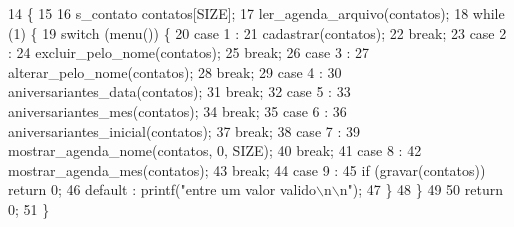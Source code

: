 \begin{DoxyCode}
14            \{ 
15     
16     s_contato contatos[SIZE];
17     ler_agenda_arquivo(contatos);
18     \textcolor{keywordflow}{while} (1) \{
19         \textcolor{keywordflow}{switch} (menu()) \{
20             \textcolor{keywordflow}{case} 1 :
21                 cadastrar(contatos);
22                 \textcolor{keywordflow}{break};
23             \textcolor{keywordflow}{case} 2 :
24                 excluir_pelo_nome(contatos);
25                 \textcolor{keywordflow}{break};
26             \textcolor{keywordflow}{case} 3 : 
27                 alterar_pelo_nome(contatos);
28                 \textcolor{keywordflow}{break};
29             \textcolor{keywordflow}{case} 4 : 
30                 aniversariantes_data(contatos);
31                 \textcolor{keywordflow}{break};
32             \textcolor{keywordflow}{case} 5 : 
33                 aniversariantes_mes(contatos);
34                 \textcolor{keywordflow}{break};
35             \textcolor{keywordflow}{case} 6 : 
36                 aniversariantes_inicial(contatos);
37                 \textcolor{keywordflow}{break};
38             \textcolor{keywordflow}{case} 7 : 
39                 mostrar_agenda_nome(contatos, 0, SIZE); 
40                 \textcolor{keywordflow}{break};
41             \textcolor{keywordflow}{case} 8 : 
42                 mostrar_agenda_mes(contatos);
43                 \textcolor{keywordflow}{break};
44             \textcolor{keywordflow}{case} 9 : 
45                 \textcolor{keywordflow}{if} (gravar(contatos)) \textcolor{keywordflow}{return} 0;
46             \textcolor{keywordflow}{default} : printf(\textcolor{stringliteral}{"entre um valor valido\(\backslash\)n\(\backslash\)n"});
47         \}
48     \}
49     
50     \textcolor{keywordflow}{return} 0;
51 \} 
\end{DoxyCode}
